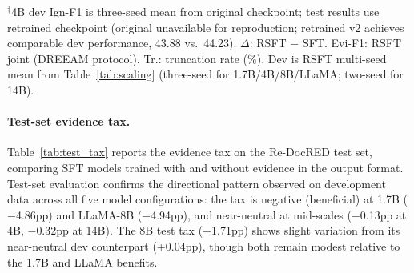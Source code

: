 \begin{table}[t]
\centering
\caption{SFT and RSFT performance on Re-DocRED test set (Ign-F1 \%). Dev Ign-F1 (RSFT) from Table~\ref{tab:scaling}. All test results use s42.}
\label{tab:test_results}
\small
{}
\vspace{-2mm}
{\raggedright\footnotesize $^\dagger$4B dev Ign-F1 is three-seed mean from original checkpoint; test results use retrained checkpoint (original unavailable for reproduction; retrained v2 achieves comparable dev performance, 43.88 vs.\ 44.23). $\Delta$: RSFT $-$ SFT. Evi-F1: RSFT joint (DREEAM protocol). Tr.: truncation rate (\%). Dev is RSFT multi-seed mean from Table~\ref{tab:scaling} (three-seed for 1.7B/4B/8B/LLaMA; two-seed for 14B).\par}
\end{table}

\paragraph{Test-set evidence tax.}
Table~\ref{tab:test_tax} reports the evidence tax on the Re-DocRED test set, comparing SFT models trained with and without evidence in the output format. Test-set evaluation confirms the directional pattern observed on development data across all five model configurations: the tax is negative (beneficial) at 1.7B ($-$4.86pp) and LLaMA-8B ($-$4.94pp), and near-neutral at mid-scales ($-$0.13pp at 4B, $-$0.32pp at 14B). The 8B test tax ($-$1.71pp) shows slight variation from its near-neutral dev counterpart (+0.04pp), though both remain modest relative to the 1.7B and LLaMA benefits.


